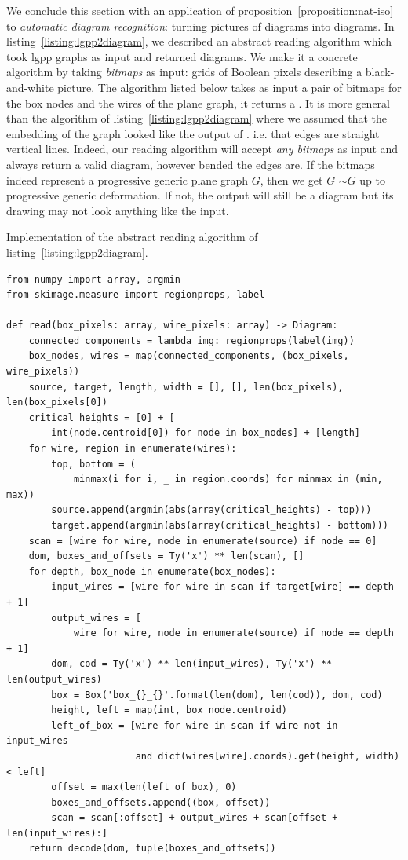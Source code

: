 We conclude this section with an application of proposition~\ref{proposition:nat-iso} to \emph{automatic diagram recognition}: turning pictures of diagrams into diagrams.
In listing~\ref{listing:lgpp2diagram}, we described an abstract reading algorithm which took lgpp graphs as input and returned diagrams.
We make it a concrete algorithm by taking \emph{bitmaps} as input: grids of Boolean pixels describing a black-and-white picture.
The algorithm  listed below takes as input a pair of bitmaps for the box nodes and the wires of the plane graph, it returns a .
It is more general than the  algorithm of listing~\ref{listing:lgpp2diagram} where we assumed that the embedding of the graph looked like the output of . i.e. that edges are straight vertical lines.
Indeed, our reading algorithm will accept \emph{any bitmaps} as input and always return a valid diagram, however bended the edges are.
If the bitmaps indeed represent a progressive generic plane graph $G$, then we get  $G$  $\sim G$ up to progressive generic deformation.
If not, the output will still be a diagram but its drawing may not look anything like the input.

\begin{python}
{\normalfont Implementation of the abstract reading algorithm of listing~\ref{listing:lgpp2diagram}.}

\begin{verbatim}
from numpy import array, argmin
from skimage.measure import regionprops, label

def read(box_pixels: array, wire_pixels: array) -> Diagram:
    connected_components = lambda img: regionprops(label(img))
    box_nodes, wires = map(connected_components, (box_pixels, wire_pixels))
    source, target, length, width = [], [], len(box_pixels), len(box_pixels[0])
    critical_heights = [0] + [
        int(node.centroid[0]) for node in box_nodes] + [length]
    for wire, region in enumerate(wires):
        top, bottom = (
            minmax(i for i, _ in region.coords) for minmax in (min, max))
        source.append(argmin(abs(array(critical_heights) - top)))
        target.append(argmin(abs(array(critical_heights) - bottom)))
    scan = [wire for wire, node in enumerate(source) if node == 0]
    dom, boxes_and_offsets = Ty('x') ** len(scan), []
    for depth, box_node in enumerate(box_nodes):
        input_wires = [wire for wire in scan if target[wire] == depth + 1]
        output_wires = [
            wire for wire, node in enumerate(source) if node == depth + 1]
        dom, cod = Ty('x') ** len(input_wires), Ty('x') ** len(output_wires)
        box = Box('box_{}_{}'.format(len(dom), len(cod)), dom, cod)
        height, left = map(int, box_node.centroid)
        left_of_box = [wire for wire in scan if wire not in input_wires
                       and dict(wires[wire].coords).get(height, width) < left]
        offset = max(len(left_of_box), 0)
        boxes_and_offsets.append((box, offset))
        scan = scan[:offset] + output_wires + scan[offset + len(input_wires):]
    return decode(dom, tuple(boxes_and_offsets))
\end{verbatim}
\end{python}

